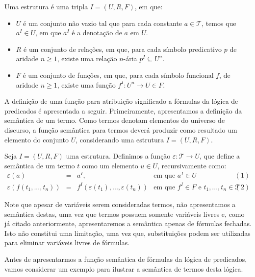 \begin{Definition}[Estrutura]
Uma estrutura é uma tripla $I = (U,R,F)$, em que:
\begin{itemize}
  \item $U$ é um conjunto não vazio tal que para cada constante $a \in
    \mathcal{T}$, temos que $a^I\in U$, em que $a^I$ é a denotação de
    $a$ em $U$.
  \item $R$ é um conjunto de relações, em que, para cada símbolo
    predicativo $p$ de aridade $n \geq 1$, existe uma relação $n$-ária
    $p^I \subseteq U^n$.
  \item $F$ é um conjunto de funções, em que, para cada símbolo
    funcional $f$, de aridade $n\geq 1$, existe uma função $f^I :
    U^n\to U \in F$.
\end{itemize}
\end{Definition}

A definição de uma função para atribuição significado a fórmulas da
lógica de predicados é apresentada a seguir. Primeiramente,
apresentamos a definição da semântica de um termo. Como termos denotam
elementos do universo de discurso, a função semântica para termos
deverá produzir como resultado um elemento do conjunto $U$,
considerando uma estrutura $I=(U,R,F)$.

\begin{Definition}
Seja $I=(U,R,F)$ uma estrutura. Definimos a função $\varepsilon : \mathcal{T}
\to U$, que define a semântica de um termo $t$ como um elemento $u\in
U$, recursivamente como:
\[
\begin{array}{lcllc}
\varepsilon(a) & = & a^I, & \text{em que }a^I\in U & (1)\\
\varepsilon(f(t_1,...,t_n)) & = &
f^I(\varepsilon(t_1),...,\varepsilon(t_n)) & \text{em que }f^I\in
F\text{ e } t_1,...,t_n \in \mathcal{T} & (2)
\end{array}
\]
\end{Definition}
Note que apesar de variáveis serem consideradas termos, não
apresentamos a semântica destas, uma vez que termos possuem somente
variáveis livres e, como já citado anteriormente, apresentaremos a
semântica apenas de fórmulas fechadas. Isto não constitui uma
limitação, uma vez que, substituições podem ser utilizadas para
eliminar variáveis livres de fórmulas.

Antes de apresentarmos a função semântica de fórmulas da lógica de
predicados, vamos considerar um exemplo para ilustrar a semântica de
termos desta lógica.


